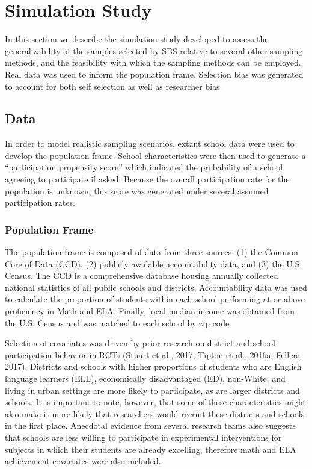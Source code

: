 \documentclass[man,floatsintext]{apa6}
\begin{document}
\hypertarget{simulation-study}{%
\section{Simulation Study}\label{simulation-study}}

In this section we describe the simulation study developed to assess the generalizability of the samples selected by SBS relative to several other sampling methods, and the feasibility with which the sampling methods can be employed. Real data was used to inform the population frame.
Selection bias was generated to account for both self selection as well as researcher bias.

\hypertarget{data}{%
\subsection{Data}\label{data}}

In order to model realistic sampling scenarios, extant school data were used to develop the population frame. School characteristics were then used to generate a \enquote{participation propensity score} which indicated the probability of a school agreeing to participate if asked. Because the overall participation rate for the population is unknown, this score was generated under several assumed participation rates.

\hypertarget{population-frame-1}{%
\subsubsection{Population Frame}\label{population-frame-1}}

The population frame is composed of data from three sources: (1) the Common Core of Data (CCD), (2) publicly available accountability data, and (3) the U.S. Census. The CCD is a comprehensive database housing annually collected national statistics of all public schools and districts. Accountability data was used to calculate the proportion of students within each school performing at or above proficiency in Math and ELA. Finally, local median income was obtained from the U.S. Census and was matched to each school by zip code.

Selection of covariates was driven by prior research on district and school participation behavior in RCTs (Stuart et al., 2017; Tipton et al., 2016a; Fellers, 2017). Districts and schools with higher proportions of students who are English language learners (ELL), economically disadvantaged (ED), non-White, and living in urban settings are more likely to participate, as are larger districts and schools. It is important to note, however, that some of these characteristics might also make it more likely that researchers would recruit these districts and schools in the first place. Anecdotal evidence from several research teams also suggests that schools are less willing to participate in experimental interventions for subjects in which their students are already excelling, therefore math and ELA achievement covariates were also included.
\end{document}
